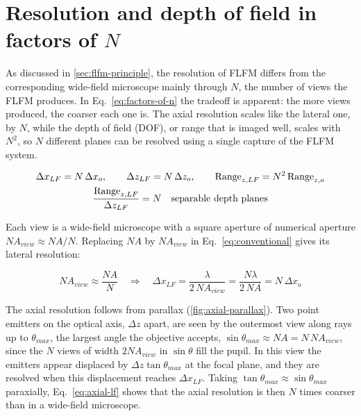 \section{Resolution and depth of field in factors of $N$}
\label{sec:factors-of-n}

As discussed in \cref{sec:flfm-principle}, the resolution of FLFM differs from the corresponding wide-field microscope mainly through $N$, the number of views the FLFM produces. In Eq.~\eqref{eq:factors-of-n} the tradeoff is apparent: the more views produced, the coarser each one is. The axial resolution scales like the lateral one, by $N$, while the depth of field (DOF), or range that is imaged well, scales with $N^2$, so $N$ different planes can be resolved using a single capture of the FLFM system.

\begin{gather}
    \Delta x_{LF} = N\,\Delta x_o, \qquad
    \Delta z_{LF} = N\,\Delta z_o, \qquad
    \mathrm{Range}_{z,LF} = N^2\,\mathrm{Range}_{z,o}
    \label{eq:factors-of-n} \\
    \frac{\mathrm{Range}_{z,LF}}{\Delta z_{LF}} = N \quad \text{separable depth planes} \notag
\end{gather}

Each view is a wide-field microscope with a square aperture of numerical aperture $NA_{view}\approx NA/N$. Replacing $NA$ by $NA_{view}$ in Eq.~\eqref{eq:conventional} gives its lateral resolution:

\begin{equation}
    NA_{view} \approx \frac{NA}{N}
    \quad\Rightarrow\quad
    \Delta x_{LF} = \frac{\lambda}{2\,NA_{view}} = \frac{N\lambda}{2\,NA} = N\,\Delta x_o
    \label{eq:lateral-lf}
\end{equation}

The axial resolution follows from parallax (\cref{fig:axial-parallax}). Two point emitters on the optical axis, $\Delta z$ apart, are seen by the outermost view along rays up to $\theta_{max}$, the largest angle the objective accepts, $\sin\theta_{max}\approx NA=N\,NA_{view}$, since the $N$ views of width $2NA_{view}$ in $\sin\theta$ fill the pupil. In this view the emitters appear displaced by $\Delta z\tan\theta_{max}$ at the focal plane, and they are resolved when this displacement reaches $\Delta x_{LF}$. Taking $\tan\theta_{max}\approx\sin\theta_{max}$ paraxially, Eq.~\eqref{eq:axial-lf} shows that the axial resolution is then $N$ times coarser than in a wide-field microscope.

